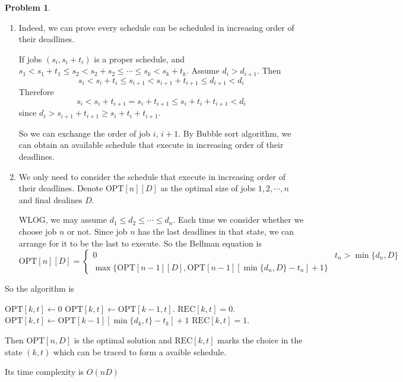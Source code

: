 \documentclass[a4paper]{article}
\theoremstyle{definition}
\newtheorem{problem}{Problem}
\theoremstyle{plain}
\newcommand{\OPT}{\mathrm{OPT}}
\numberwithin{equation}{problem}
\begin{document}
\begin{problem}
    \begin{enumerate}[label=(\alph*)]
        \item Indeed, we can prove every schedule can be scheduled in increasing order of their deadlines.
        
        If jobs  $ (s_i,s_i+t_i) $ is a proper schedule, and  $ s_1<s_1+t_1 \leq s_2<s_2+s_2 \leq \cdots \leq s_k<s_k+t_k $. Assume  $ d_i>d_{i+1} $. Then 
        \[s_i<s_i+t_i \leq s_{i+1}<s_{i+1}+t_{i+1} \leq d_{i+1}<d_i\]
        Therefore
        \[s_i<s_i+t_{i+1}=s_i+t_{i+1} \leq s_i+t_i+t_{i+1}<d_i\]
        since  $ d_i>s_{i+1}+t_{i+1} \geq s_i+t_i+t_{i+1} $.
        
        So  we can exchange the order of job  $ i $, $ i+1 $. By Bubble sort algorithm, we can obtain an available schedule that execute in increasing order of their deadlines.

        \item We only need to consider the schedule that execute in increasing order of their deadlines.
        Denote  $ \OPT[n][D] $ as the optimal size of jobs $ 1,2,\cdots,n $  and final dealines  $ D $.

        WLOG, we may assume  $ d_1 \leq d_2 \leq \cdots \leq d_n $.
        Each time we consider whether we choose job  $ n $ or not. Since job  $ n $ has the last deadlines in that state, we can arrange for it to be the last to   execute. So the Bellman equation is 
        \[\OPT[n][D]=\begin{cases}
            0&t_n>\min\{d_n,D\}\\
            \max\{\OPT[n-1][D],\OPT[n-1][\min\{d_n,D\}-t_n]+1\}
        \end{cases}\]  
    \end{enumerate}
    So the algorithm is 
    
    \begin{algorithm}
        \caption{$ \OPT $}
        \begin{algorithmic}[1]
            \STATE $ \OPT[k,t]\leftarrow0 $  \ENDIF 
            \STATE  $ \OPT[k,t]\leftarrow \OPT[k-1,t] $.
            \STATE  $ \mathrm{REC}[k,t]=0 $.
            \IF{ $ \OPT[k,t]<\OPT[k-1][\min\{d_k,t\}-t_k]+1 $ }
                \STATE     $ \OPT[k,t]\leftarrow\OPT[k-1][\min\{d_k,t\}-t_k]+1 $
                \STATE  $ \mathrm{REC}[k,t]=1 $.
            \ENDIF 
            \ENDFOR
        \end{algorithmic}
    \end{algorithm}


    Then  $ \OPT[n,D] $ is the optimal solution and  $ \mathrm{REC}[k,t] $ marks the choice in the state  $ (k,t) $ which can be traced to form a avaible schedule.
    
    Its time complexity is  $ O(nD) $ 
\end{problem}
\end{document}
